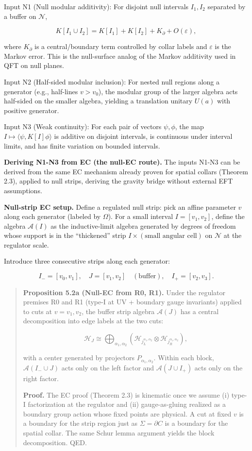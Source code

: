 \documentclass[
]{article}
\begin{document}
Input N1 (Null modular additivity): For disjoint null intervals
\(I_1, I_2\) separated by a buffer on \(\mathcal N\),

\[
K[I_1 \cup I_2] = K[I_1] + K[I_2] + K_{\partial} + O(\varepsilon),
\]

where \(K_{\partial}\) is a central/boundary term controlled by collar
labels and \(\varepsilon\) is the Markov error. This is the null-surface
analog of the Markov additivity used in QFT on null planes.

Input N2 (Half-sided modular inclusion): For nested null regions along a
generator (e.g., half-lines \(v > v_0\)), the modular group of the
larger algebra acts half-sided on the smaller algebra, yielding a
translation unitary \(U(a)\) with positive generator.

Input N3 (Weak continuity): For each pair of vectors \(\psi,\phi\), the
map \(I \mapsto \langle \psi, K[I] \phi \rangle\) is additive on
disjoint intervals, is continuous under interval limits, and has finite
variation on bounded intervals.

\textbf{Deriving N1-N3 from EC (the null-EC route).} The inputs N1-N3
can be derived from the same EC mechanism already proven for spatial
collars (Theorem 2.3), applied to null strips, deriving the gravity
bridge without external EFT assumptions.

\textbf{Null-strip EC setup.} Define a regulated null strip: pick an
affine parameter \(v\) along each generator (labeled by \(\Omega\)). For
a small interval \(I = [v_1, v_2]\), define the algebra
\(\mathcal{A}(I)\) as the inductive-limit algebra generated by degrees
of freedom whose support is in the ``thickened'' strip
\(I \times (\text{small angular cell})\) on \(\mathcal{N}\) at the
regulator scale.

Introduce three consecutive strips along each generator:

\[
I_- = [v_0, v_1], \quad J = [v_1, v_2] \quad (\text{buffer}), \quad
I_+ = [v_2, v_3].
\]

\begin{quote}
\textbf{Proposition 5.2a (Null-EC from R0, R1).} Under the regulator
premises R0 and R1 (type-I at UV + boundary gauge invariants) applied to
cuts at \(v = v_1, v_2\), the buffer strip algebra \(\mathcal{A}(J)\)
has a central decomposition into edge labels at the two cuts:

\[
\mathcal{H}_J \cong \bigoplus_{\alpha_1, \alpha_2}
\left(\mathcal{H}_{j_L^{\alpha_1, \alpha_2}} \otimes
\mathcal{H}_{j_R^{\alpha_1, \alpha_2}}\right),
\]

with a center generated by projectors \(P_{\alpha_1, \alpha_2}\). Within
each block, \(\mathcal{A}(I_- \cup J)\) acts only on the left factor and
\(\mathcal{A}(J \cup I_+)\) acts only on the right factor.

\textbf{Proof.} The EC proof (Theorem 2.3) is kinematic once we assume
(i) type-I factorization at the regulator and (ii) gauge-as-gluing
realized as a boundary group action whose fixed points are physical. A
cut at fixed \(v\) is a boundary for the strip region just as
\(\Sigma = \partial C\) is a boundary for the spatial collar. The same
Schur lemma argument yields the block decomposition. QED.
\end{quote}
\end{document}
